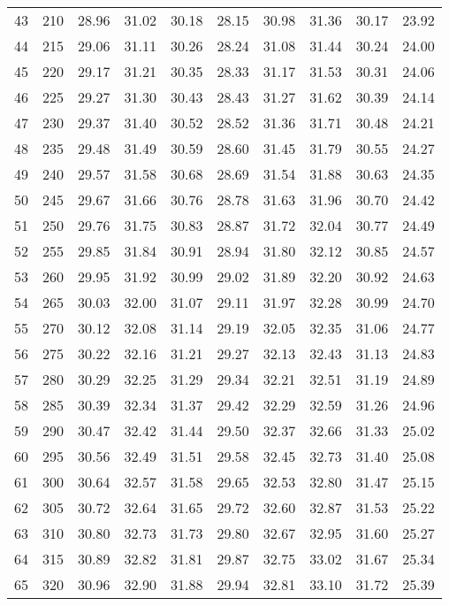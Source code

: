 \begin{longtable}{rrllllllll}
43 & 210 & 28.96 & 31.02 & 30.18 & 28.15 & 30.98 & 31.36 & 30.17 & 23.92 \\ 
44 & 215 & 29.06 & 31.11 & 30.26 & 28.24 & 31.08 & 31.44 & 30.24 & 24.00 \\ 
45 & 220 & 29.17 & 31.21 & 30.35 & 28.33 & 31.17 & 31.53 & 30.31 & 24.06 \\ 
46 & 225 & 29.27 & 31.30 & 30.43 & 28.43 & 31.27 & 31.62 & 30.39 & 24.14 \\ 
47 & 230 & 29.37 & 31.40 & 30.52 & 28.52 & 31.36 & 31.71 & 30.48 & 24.21 \\ 
48 & 235 & 29.48 & 31.49 & 30.59 & 28.60 & 31.45 & 31.79 & 30.55 & 24.27 \\ 
49 & 240 & 29.57 & 31.58 & 30.68 & 28.69 & 31.54 & 31.88 & 30.63 & 24.35 \\ 
50 & 245 & 29.67 & 31.66 & 30.76 & 28.78 & 31.63 & 31.96 & 30.70 & 24.42 \\ 
51 & 250 & 29.76 & 31.75 & 30.83 & 28.87 & 31.72 & 32.04 & 30.77 & 24.49 \\ 
52 & 255 & 29.85 & 31.84 & 30.91 & 28.94 & 31.80 & 32.12 & 30.85 & 24.57 \\ 
53 & 260 & 29.95 & 31.92 & 30.99 & 29.02 & 31.89 & 32.20 & 30.92 & 24.63 \\ 
54 & 265 & 30.03 & 32.00 & 31.07 & 29.11 & 31.97 & 32.28 & 30.99 & 24.70 \\ 
55 & 270 & 30.12 & 32.08 & 31.14 & 29.19 & 32.05 & 32.35 & 31.06 & 24.77 \\ 
56 & 275 & 30.22 & 32.16 & 31.21 & 29.27 & 32.13 & 32.43 & 31.13 & 24.83 \\ 
57 & 280 & 30.29 & 32.25 & 31.29 & 29.34 & 32.21 & 32.51 & 31.19 & 24.89 \\ 
58 & 285 & 30.39 & 32.34 & 31.37 & 29.42 & 32.29 & 32.59 & 31.26 & 24.96 \\ 
59 & 290 & 30.47 & 32.42 & 31.44 & 29.50 & 32.37 & 32.66 & 31.33 & 25.02 \\ 
60 & 295 & 30.56 & 32.49 & 31.51 & 29.58 & 32.45 & 32.73 & 31.40 & 25.08 \\ 
61 & 300 & 30.64 & 32.57 & 31.58 & 29.65 & 32.53 & 32.80 & 31.47 & 25.15 \\ 
62 & 305 & 30.72 & 32.64 & 31.65 & 29.72 & 32.60 & 32.87 & 31.53 & 25.22 \\ 
63 & 310 & 30.80 & 32.73 & 31.73 & 29.80 & 32.67 & 32.95 & 31.60 & 25.27 \\ 
64 & 315 & 30.89 & 32.82 & 31.81 & 29.87 & 32.75 & 33.02 & 31.67 & 25.34 \\ 
65 & 320 & 30.96 & 32.90 & 31.88 & 29.94 & 32.81 & 33.10 & 31.72 & 25.39 \\ 

\end{longtable}

